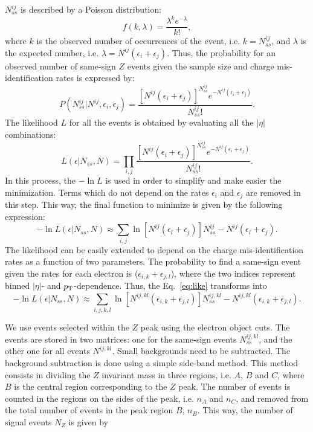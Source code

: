 $N^{ij}_{ss}$ is described by a Poisson distribution:
\begin{equation}
f(k,\lambda)=\frac{\lambda^k e^{-\lambda}}{k!},
\end{equation}
where $k$ is the observed number of occurrences of the event, i.e. $k=N^{ij}_{ss}$, and $\lambda$ is the expected number,  i.e. $\lambda=N^{ij}(\epsilon_i+\epsilon_j)$. Thus, the probability for an observed number of same-sign $Z$ events given the sample size and charge mis-identification rates is expressed by:
\begin{equation}
P(N^{ij}_{ss}|N^{ij},\epsilon_i,\epsilon_j)=\frac{[N^{ij}(\epsilon_i+\epsilon_j)]^{N_{ss}^{ij}}e^{-N^{ij}(\epsilon_i+\epsilon_j)}}{N^{ij}_{ss}!}.
\end{equation}
The likelihood $L$ for all the events is obtained by evaluating all the $|\eta|$ combinations:
\begin{equation}
L(\epsilon|N_{ss},N)=\prod_{i,j}\frac{[N^{ij}(\epsilon_i+\epsilon_j)]^{N_{ss}^{ij}}e^{-N^{ij}(\epsilon_i+\epsilon_j)}}{N^{ij}_{ss}!}.
\end{equation}
In this process, the $-\ln L$ is used in order to simplify and make easier the minimization. Terms which do not depend on the rates $\epsilon_i$ and $\epsilon_j$ are removed in this step. This way, the final function to minimize is given by the following expression:
\begin{equation}
\label{eq:like}
-\ln L(\epsilon|N_{ss},N)\approx \sum_{i,j}\ln[N^{ij}(\epsilon_i+\epsilon_j)]N^{ij}_{ss}-N^{ij}(\epsilon_i+\epsilon_j).
\end{equation}
The likelihood can be easily extended to depend on the charge mis-identification rates as a function of two parameters. The probability to find a same-sign event given the rates for each electron is ($\epsilon_{i,k}+\epsilon_{j,l}$), where the two indices represent binned $|\eta|$- and $p_{\rm T}$-dependence. Thus, the Eq.~\ref{eq:like} transforms into
\begin{equation}
-\ln L(\epsilon|N_{ss},N)\approx \sum_{i,j,k,l}\ln[N^{ij,kl}(\epsilon_{i,k}+\epsilon_{j,l})]N^{ij,kl}_{ss}-N^{ij,kl}(\epsilon_{i,k}+\epsilon_{j,l}).
\end{equation}   

We use events selected within the $Z$ peak using the \tth electron object cuts. The events are stored in two matrices: one for the same-sign events $N^{ij,kl}_{ss}$,  and the other one for all events $N^{ij,kl}$. Small backgrounds need to be subtracted. The background subtraction is done using a simple side-band method.  This method consists in dividing the $Z$ invariant mass in three regions, i.e. $A$, $B$ and $C$, where $B$ is the central region corresponding to the $Z$ peak. The number of events is counted in the regions on the sides of the peak, i.e. $n_A$ and $n_C$, and removed  from the total number of events in the peak region $B$, $n_B$. This way, the number of signal events $N_Z$ is given by

